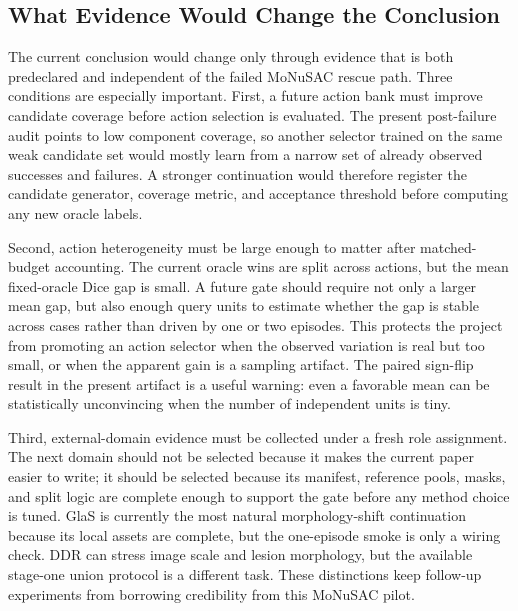 \subsection{What Evidence Would Change the Conclusion}
The current conclusion would change only through evidence that is both predeclared and independent of the failed MoNuSAC rescue path. Three conditions are especially important. First, a future action bank must improve candidate coverage before action selection is evaluated. The present post-failure audit points to low component coverage, so another selector trained on the same weak candidate set would mostly learn from a narrow set of already observed successes and failures. A stronger continuation would therefore register the candidate generator, coverage metric, and acceptance threshold before computing any new oracle labels.

Second, action heterogeneity must be large enough to matter after matched-budget accounting. The current oracle wins are split across actions, but the mean fixed-oracle Dice gap is small. A future gate should require not only a larger mean gap, but also enough query units to estimate whether the gap is stable across cases rather than driven by one or two episodes. This protects the project from promoting an action selector when the observed variation is real but too small, or when the apparent gain is a sampling artifact. The paired sign-flip result in the present artifact is a useful warning: even a favorable mean can be statistically unconvincing when the number of independent units is tiny.

Third, external-domain evidence must be collected under a fresh role assignment. The next domain should not be selected because it makes the current paper easier to write; it should be selected because its manifest, reference pools, masks, and split logic are complete enough to support the gate before any method choice is tuned. GlaS is currently the most natural morphology-shift continuation because its local assets are complete, but the one-episode smoke is only a wiring check. DDR can stress image scale and lesion morphology, but the available stage-one union protocol is a different task. These distinctions keep follow-up experiments from borrowing credibility from this MoNuSAC pilot.

